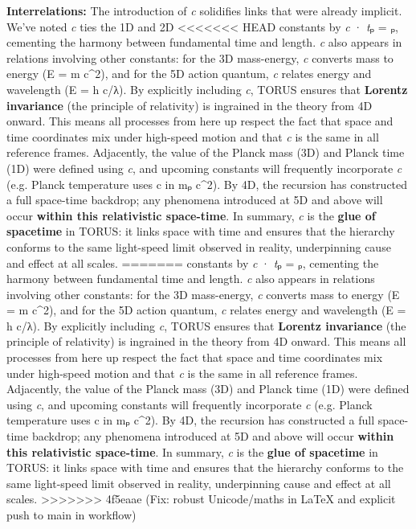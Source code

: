 \documentclass[]{article}
\begin{document}
\textbf{Interrelations:} The introduction of \emph{c} solidifies links
that were already implicit. We've noted \emph{c} ties the 1D and 2D
<<<<<<< HEAD
constants by \emph{c} · \emph{t}ₚ = \emph{\ell}ₚ\hspace{0pt}, cementing the
harmony between fundamental time and length. \emph{c} also appears in
relations involving other constants: for the 3D mass-energy, \emph{c}
converts mass to energy (E = m c\^{}2), and for the 5D action quantum,
\emph{c} relates energy and wavelength (E = h c/λ)\hspace{0pt}. By
explicitly including \emph{c}, TORUS ensures that \textbf{Lorentz
invariance} (the principle of relativity) is ingrained in the theory
from 4D onward. This means all processes from here up respect the fact
that space and time coordinates mix under high-speed motion and that
\emph{c} is the same in all reference frames. Adjacently, the value of
the Planck mass (3D) and Planck time (1D) were defined using \emph{c},
and upcoming constants will frequently incorporate \emph{c} (e.g. Planck
temperature uses c in mₚ c\^{}2). By 4D, the recursion has constructed a
full space-time backdrop; any phenomena introduced at 5D and above will
occur \textbf{within this relativistic space-time}\hspace{0pt}. In
summary, \emph{c} is the \textbf{glue of spacetime} in TORUS: it links
space with time and ensures that the hierarchy conforms to the same
light-speed limit observed in reality, underpinning cause and effect at
all scales.
=======
constants by \emph{c} · \emph{t}ₚ = \emph{\ell}ₚ​, cementing the harmony
between fundamental time and length. \emph{c} also appears in relations
involving other constants: for the 3D mass-energy, \emph{c} converts
mass to energy (E = m c\^{}2), and for the 5D action quantum, \emph{c}
relates energy and wavelength (E = h c/λ)​. By explicitly including
\emph{c}, TORUS ensures that \textbf{Lorentz invariance} (the principle
of relativity) is ingrained in the theory from 4D onward. This means all
processes from here up respect the fact that space and time coordinates
mix under high-speed motion and that \emph{c} is the same in all
reference frames. Adjacently, the value of the Planck mass (3D) and
Planck time (1D) were defined using \emph{c}, and upcoming constants
will frequently incorporate \emph{c} (e.g. Planck temperature uses c in
mₚ c\^{}2). By 4D, the recursion has constructed a full space-time
backdrop; any phenomena introduced at 5D and above will occur
\textbf{within this relativistic space-time}​. In summary, \emph{c} is
the \textbf{glue of spacetime} in TORUS: it links space with time and
ensures that the hierarchy conforms to the same light-speed limit
observed in reality, underpinning cause and effect at all scales.
>>>>>>> 4f5eaae (Fix: robust Unicode/maths in LaTeX and explicit push to main in workflow)
\end{document}
